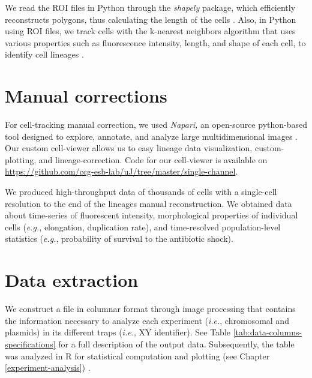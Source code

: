 \documentclass[
  12pt,
  a4paper,
  oneside]{krantz}
\begin{document}
We read the ROI files in Python through the \emph{shapely} package, which
efficiently reconstructs polygons, thus calculating the length of the
cells \citep{10.5555/1593511, shapely2007}. Also, in Python using ROI files,
we track cells with the k-nearest neighbors algorithm that uses various
properties such as fluorescence intensity, length, and shape of each
cell, to identify cell lineages \citep{altman1992}.

\hypertarget{manual-corrections}{%
\section{Manual corrections}\label{manual-corrections}}

For cell-tracking manual correction, we used \emph{Napari,} an open-source
python-based tool designed to explore, annotate, and analyze large
multidimensional images \citep{sofroniew2021a}. Our custom cell-viewer allows
us to easy lineage data visualization, custom-plotting, and
lineage-correction. Code for our cell-viewer is available on
\url{https://github.com/ccg-esb-lab/uJ/tree/master/single-channel}.

We produced high-throughput data of thousands of cells with a
single-cell resolution to the end of the lineages manual reconstruction.
We obtained data about time-series of fluorescent intensity,
morphological properties of individual cells (\emph{e.g.}, elongation,
duplication rate), and time-resolved population-level statistics
(\emph{e.g.}, probability of survival to the antibiotic shock).

\hypertarget{data-extraction}{%
\section{Data extraction}\label{data-extraction}}

We construct a file in columnar format through image processing that
contains the information necessary to analyze each experiment (\emph{i.e.},
chromosomal and plasmids) in its different traps (\emph{i.e.}, XY
identifier). See Table \ref{tab:data-columns-specifications} for a full
description of the output data. Subsequently, the table was analyzed in
R for statistical computation and plotting (see Chapter
\ref{experiment-analysis}) \citep{R-base}.
\end{document}
